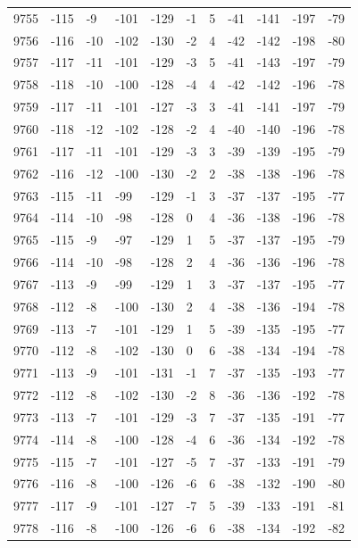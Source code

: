 \begin{table}[H]
\begin{tabular}{lllllllllll}
9755 & -115 & -9 & -101 & -129 & -1 & 5 & -41 & -141 & -197 & -79 \\
9756 & -116 & -10 & -102 & -130 & -2 & 4 & -42 & -142 & -198 & -80 \\
9757 & -117 & -11 & -101 & -129 & -3 & 5 & -41 & -143 & -197 & -79 \\
9758 & -118 & -10 & -100 & -128 & -4 & 4 & -42 & -142 & -196 & -78 \\
9759 & -117 & -11 & -101 & -127 & -3 & 3 & -41 & -141 & -197 & -79 \\
9760 & -118 & -12 & -102 & -128 & -2 & 4 & -40 & -140 & -196 & -78 \\
9761 & -117 & -11 & -101 & -129 & -3 & 3 & -39 & -139 & -195 & -79 \\
9762 & -116 & -12 & -100 & -130 & -2 & 2 & -38 & -138 & -196 & -78 \\
9763 & -115 & -11 & -99 & -129 & -1 & 3 & -37 & -137 & -195 & -77 \\
9764 & -114 & -10 & -98 & -128 & 0 & 4 & -36 & -138 & -196 & -78 \\
9765 & -115 & -9 & -97 & -129 & 1 & 5 & -37 & -137 & -195 & -79 \\
9766 & -114 & -10 & -98 & -128 & 2 & 4 & -36 & -136 & -196 & -78 \\
9767 & -113 & -9 & -99 & -129 & 1 & 3 & -37 & -137 & -195 & -77 \\
9768 & -112 & -8 & -100 & -130 & 2 & 4 & -38 & -136 & -194 & -78 \\
9769 & -113 & -7 & -101 & -129 & 1 & 5 & -39 & -135 & -195 & -77 \\
9770 & -112 & -8 & -102 & -130 & 0 & 6 & -38 & -134 & -194 & -78 \\
9771 & -113 & -9 & -101 & -131 & -1 & 7 & -37 & -135 & -193 & -77 \\
9772 & -112 & -8 & -102 & -130 & -2 & 8 & -36 & -136 & -192 & -78 \\
9773 & -113 & -7 & -101 & -129 & -3 & 7 & -37 & -135 & -191 & -77 \\
9774 & -114 & -8 & -100 & -128 & -4 & 6 & -36 & -134 & -192 & -78 \\
9775 & -115 & -7 & -101 & -127 & -5 & 7 & -37 & -133 & -191 & -79 \\
9776 & -116 & -8 & -100 & -126 & -6 & 6 & -38 & -132 & -190 & -80 \\
9777 & -117 & -9 & -101 & -127 & -7 & 5 & -39 & -133 & -191 & -81 \\
9778 & -116 & -8 & -100 & -126 & -6 & 6 & -38 & -134 & -192 & -82 \\

\end{tabular}
\end{table}
